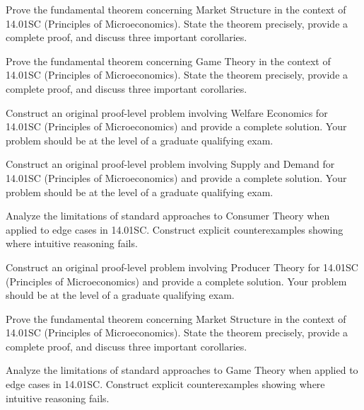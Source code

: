 \documentclass[12pt,a4paper]{exam}
\begin{document}
\begin{questions}
\question[4]
Prove the fundamental theorem concerning Market Structure in the context of 14.01SC (Principles of Microeconomics). State the theorem precisely, provide a complete proof, and discuss three important corollaries.

\vspace{0.3cm}

\question[3]
Prove the fundamental theorem concerning Game Theory in the context of 14.01SC (Principles of Microeconomics). State the theorem precisely, provide a complete proof, and discuss three important corollaries.

\vspace{0.3cm}

\question[3]
Construct an original proof-level problem involving Welfare Economics for 14.01SC (Principles of Microeconomics) and provide a complete solution. Your problem should be at the level of a graduate qualifying exam.

\vspace{0.3cm}

\question[3]
Construct an original proof-level problem involving Supply and Demand for 14.01SC (Principles of Microeconomics) and provide a complete solution. Your problem should be at the level of a graduate qualifying exam.

\vspace{0.3cm}

\question[3]
Analyze the limitations of standard approaches to Consumer Theory when applied to edge cases in 14.01SC. Construct explicit counterexamples showing where intuitive reasoning fails.

\vspace{0.3cm}

\question[6]
Construct an original proof-level problem involving Producer Theory for 14.01SC (Principles of Microeconomics) and provide a complete solution. Your problem should be at the level of a graduate qualifying exam.

\vspace{0.3cm}

\question[4]
Prove the fundamental theorem concerning Market Structure in the context of 14.01SC (Principles of Microeconomics). State the theorem precisely, provide a complete proof, and discuss three important corollaries.

\vspace{0.3cm}

\question[2]
Analyze the limitations of standard approaches to Game Theory when applied to edge cases in 14.01SC. Construct explicit counterexamples showing where intuitive reasoning fails.


\end{questions}
\end{document}
